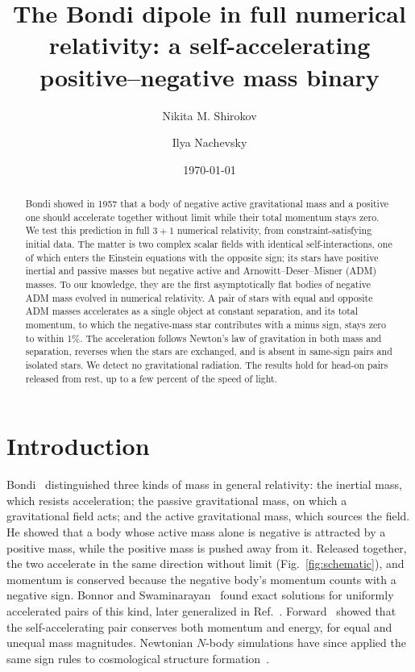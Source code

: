 \documentclass[twocolumn,floatfix,aps,prd,superscriptaddress,nofootinbib]{revtex4-2}
\begin{document}
\title{The Bondi dipole in full numerical relativity: a self-accelerating positive--negative mass binary}

\author{Nikita M. Shirokov}
\author{Ilya Nachevsky}
\date{\today}

\begin{abstract}
Bondi showed in 1957 that a body of negative active gravitational mass and a positive one should accelerate together without limit while their total momentum stays zero. We test this prediction in full $3{+}1$ numerical relativity, from constraint-satisfying initial data. The matter is two complex scalar fields with identical self-interactions, one of which enters the Einstein equations with the opposite sign; its stars have positive inertial and passive masses but negative active and Arnowitt--Deser--Misner (ADM) masses. To our knowledge, they are the first asymptotically flat bodies of negative ADM mass evolved in numerical relativity. A pair of stars with equal and opposite ADM masses accelerates as a single object at constant separation, and its total momentum, to which the negative-mass star contributes with a minus sign, stays zero to within 1\%. The acceleration follows Newton's law of gravitation in both mass and separation, reverses when the stars are exchanged, and is absent in same-sign pairs and isolated stars. We detect no gravitational radiation. The results hold for head-on pairs released from rest, up to a few percent of the speed of light.
\end{abstract}

\maketitle

\section{Introduction}
\label{sec:intro}

Bondi~\cite{bondi1957} distinguished three kinds of mass in general relativity: the inertial mass, which resists acceleration; the passive gravitational mass, on which a gravitational field acts; and the active gravitational mass, which sources the field. He showed that a body whose active mass alone is negative is attracted by a positive mass, while the positive mass is pushed away from it. Released together, the two accelerate in the same direction without limit (Fig.~\ref{fig:schematic}), and momentum is conserved because the negative body's momentum counts with a negative sign. Bonnor and Swaminarayan~\cite{bonnor_swami1964} found exact solutions for uniformly accelerated pairs of this kind, later generalized in Ref.~\cite{bicak1983}. Forward~\cite{forward1990} showed that the self-accelerating pair conserves both momentum and energy, for equal and unequal mass magnitudes. Newtonian $N$-body simulations have since applied the same sign rules to cosmological structure formation~\cite{manfredi2018,manfredi2026}.
\end{document}
